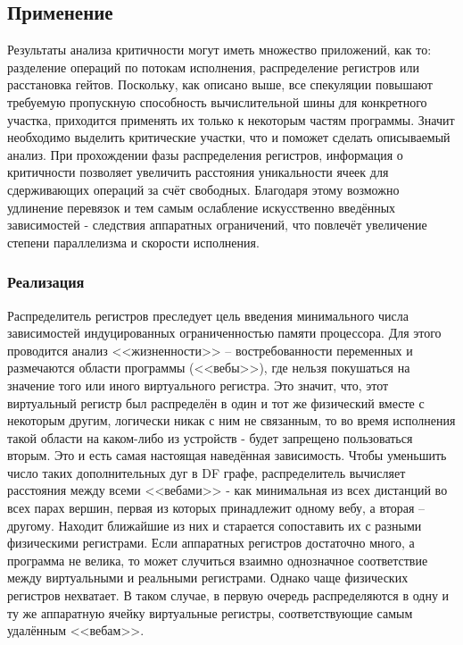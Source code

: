 \documentclass[a4paper,12pt,titlepage]{article}
\begin{document}
\subsection{Применение}
Результаты анализа критичности могут иметь множество приложений, как то: разделение операций по потокам исполнения, распределение регистров или расстановка гейтов. Поскольку, как описано выше, все спекуляции повышают требуемую пропускную способность вычислительной шины для конкретного участка, приходится применять их только к некоторым частям программы. Значит необходимо выделить критические участки, что и поможет сделать описываемый анализ.
При прохождении фазы распределения регистров, информация о критичности позволяет увеличить расстояния уникальности ячеек для сдерживающих операций за счёт свободных. Благодаря этому возможно удлинение перевязок и тем самым ослабление искусственно введённых зависимостей - следствия аппаратных ограничений, что повлечёт увеличение степени параллелизма и скорости исполнения.

\subsubsection{Реализация}
Распределитель регистров преследует цель введения минимального числа зависимостей индуцированных ограниченностью памяти процессора. Для этого проводится анализ <<жизненности>> -- востребованности переменных и размечаются области программы (<<вебы>>), где нельзя покушаться на значение того или иного виртуального регистра. Это значит, что, этот виртуальный регистр был распределён в один и тот же физический вместе с некоторым другим, логически никак с ним не связанным, то во время исполнения такой области на каком-либо из устройств - будет запрещено пользоваться вторым. Это и есть самая настоящая наведённая зависимость. Чтобы уменьшить число таких дополнительных дуг в DF графе, распределитель вычисляет расстояния между всеми <<вебами>>  - как минимальная из всех дистанций во всех парах вершин, первая из которых принадлежит одному вебу, а вторая -- другому. Находит ближайшие из них и старается сопоставить их с разными физическими регистрами. Если аппаратных регистров достаточно много, а программа не велика, то может случиться взаимно однозначное соответствие между виртуальными и реальными регистрами. Однако чаще физических регистров нехватает. В таком случае, в первую очередь распределяются в одну и ту же аппаратную ячейку виртуальные регистры, соответствующие самым удалённым <<вебам>>.
\end{document}
